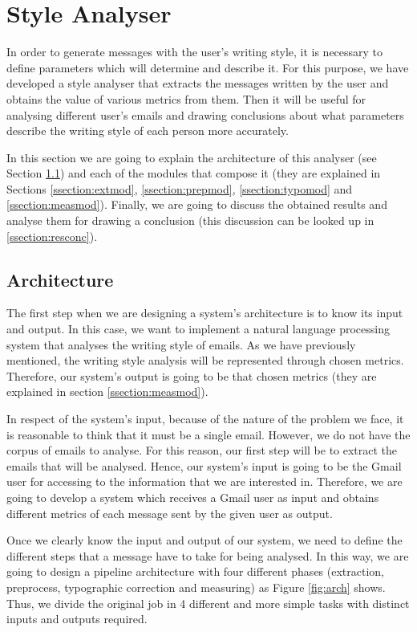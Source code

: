 \chapter{Style Analyser}
\label{cap:analyser}

In order to generate messages with the user's writing style, it is necessary to define parameters which will determine and describe it. For this purpose, we have developed a style analyser that extracts the messages written by the user and obtains the value of various metrics from them. Then it will be useful for analysing different user's emails and drawing conclusions about what parameters describe the writing style of each person more accurately.

In this section we are going to explain the architecture of this analyser (see Section \ref{ssection:stylearch}) and each of the modules that compose it (they are explained in Sections \ref{ssection:extmod}, \ref{ssection:prepmod}, \ref{ssection:typomod} and \ref{ssection:measmod}). Finally, we are going to discuss the obtained results and analyse them for drawing a conclusion (this discussion can be looked up in \ref{ssection:resconc}).

\section{Architecture} \label{ssection:stylearch}
The first step when we are designing a system's architecture is to know its input and output. In this case, we want to implement a natural language processing system that analyses the writing style of emails. As we have previously mentioned, the writing style analysis will be represented through chosen metrics. Therefore, our system's output is going to be that chosen metrics (they are explained in section \ref{ssection:measmod}).

In respect of the system's input, because of the nature of the problem we face, it is reasonable to think that it must be a single email. However, we do not have the corpus of emails to analyse. For this reason, our first step will be to extract the emails that will be analysed. Hence, our system's input is going to be the Gmail user for accessing to the information that we are interested in. Therefore, we are going to develop a system which receives a Gmail user as input and obtains different metrics of each message sent by the given user as output.

Once we clearly know the input and output of our system, we need to define the different steps that a message have to take for being analysed. In this way, we are going to design a pipeline architecture with four different phases (extraction, preprocess, typographic correction and measuring) as Figure \ref{fig:arch} shows. Thus, we divide the original job in 4 different and more simple tasks with distinct inputs and outputs required.

